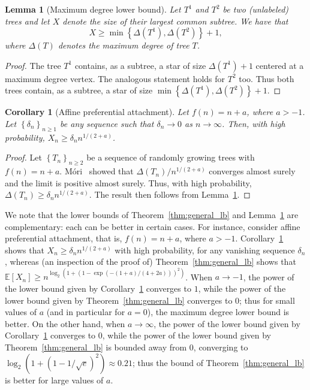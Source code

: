 \documentclass[11pt]{article}
\numberwithin{equation}{section}
\newcommand{\E}{\mathbb{E}} %
\newtheorem{lemma}[theorem]{Lemma}
\newtheorem{corollary}[theorem]{Corollary}
\theoremstyle{definition}
\begin{document}
\begin{lemma}[Maximum degree lower bound]\label{lem:max_degree_lb}
Let $T^{1}$ and $T^{2}$ be two (unlabeled) trees and let $X$ denote the size of their largest common subtree. We have that 
\[
X \geq \min \left\{ \Delta(T^{1}), \Delta(T^{2}) \right\} + 1,
\]
where $\Delta(T)$ denotes the maximum degree of tree $T$. 
\end{lemma}
\begin{proof}
The tree $T^{1}$ contains, as a subtree, a star of size $\Delta(T^{1})+1$ centered at a maximum degree vertex. The analogous statement holds for $T^{2}$ too. Thus both trees contain, as a subtree, a star of size $\min \left\{ \Delta(T^{1}), \Delta(T^{2}) \right\} + 1$. 
\end{proof}

\begin{corollary}[Affine preferential attachment]\label{cor:affine}
Let $f(n) = n + a$, where $a > -1$. 
Let $\left\{ \delta_{n} \right\}_{n \geq 1}$ be any sequence such that $\delta_{n} \to 0$ as $n \to \infty$. 
Then, with high probability, $X_{n} \geq \delta_{n} n^{1/(2+a)}$.
\end{corollary}
\begin{proof}
Let $\left\{T_{n} \right\}_{n \geq 2}$ be a sequence of randomly growing trees with $f(n) = n + a$. 
M\'ori~\cite{mori05maxdegree} showed that 
$\Delta(T_{n}) / n^{1/(2+a)}$ converges almost surely and the limit is positive almost surely. 
Thus, with high probability, $\Delta(T_{n}) \geq \delta_{n} n^{1/(2+a)}$. 
The result then follows from Lemma~\ref{lem:max_degree_lb}. 
\end{proof}

We note that the lower bounds of Theorem~\ref{thm:general_lb} and Lemma~\ref{lem:max_degree_lb} are complementary: each can be better in certain cases. 
For instance, consider affine preferential attachment, that is, $f(n) = n + a$, where $a > -1$. 
Corollary~\ref{cor:affine} shows that $X_n \geq \delta_{n} n^{1/(2+a)}$ with high probability, for any vanishing sequence $\delta_{n}$, 
whereas (an inspection of the proof of) Theorem~\ref{thm:general_lb} shows that 
$\E[X_{n}] \geq n^{\log_{2}(1 + (1 - \exp(- (1+a)/(4+2a)))^{2})}$. 
When $a \to -1$, the power of the lower bound given by Corollary~\ref{cor:affine} converges to $1$, 
while the power of the lower bound given by Theorem~\ref{thm:general_lb} converges to $0$; 
thus for small values of $a$ (and in particular for $a = 0$), the maximum degree lower bound is better. 
On the other hand, when $a \to \infty$, 
the power of the lower bound given by Corollary~\ref{cor:affine} converges to $0$, 
while the power of the lower bound given by Theorem~\ref{thm:general_lb} is bounded away from $0$, converging to $\log_{2}(1+(1-1/\sqrt{e})^{2}) \approx 0.21$; 
thus the bound of Theorem~\ref{thm:general_lb} is better for large values of $a$.
\end{document}
